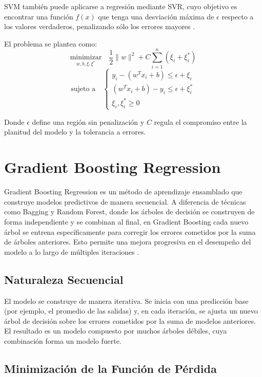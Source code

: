 	SVM también puede aplicarse a regresión mediante SVR, cuyo objetivo es encontrar una función $f(x)$ que tenga una desviación máxima de $\epsilon$ respecto a los valores verdaderos, penalizando sólo los errores mayores \citep{james2013, veirana2021}.
	
	El problema se plantea como:
	\[
	\underset{w, b, \xi, \xi^*}{\text{minimizar}} \quad \frac{1}{2} \|w\|^2 + C \sum_{i=1}^{n} (\xi_i + \xi_i^*)
	\]
	\[
	\text{sujeto a} \quad 
	\begin{cases}
		y_i - (w^T x_i + b) \leq \epsilon + \xi_i \\
		(w^T x_i + b) - y_i \leq \epsilon + \xi_i^* \\
		\xi_i, \xi_i^* \geq 0
	\end{cases}
	\]
	
	Donde $\epsilon$ define una región sin penalización y $C$ regula el compromiso entre la planitud del modelo y la tolerancia a errores.

	
	
\section{Gradient Boosting Regression}

Gradient Boosting Regression es un método de aprendizaje ensamblado que construye modelos predictivos de manera secuencial. A diferencia de técnicas como Bagging y Random Forest, donde los árboles de decisión se construyen de forma independiente y se combinan al final, en Gradient Boosting cada nuevo árbol se entrena específicamente para corregir los errores cometidos por la suma de árboles anteriores. Esto permite una mejora progresiva en el desempeño del modelo a lo largo de múltiples iteraciones \citep{hastie2009, friedman2001}.

\subsection{Naturaleza Secuencial}

El modelo se construye de manera iterativa. Se inicia con una predicción base (por ejemplo, el promedio de las salidas) y, en cada iteración, se ajusta un nuevo árbol de decisión sobre los errores cometidos por la suma de modelos anteriores. El resultado es un modelo compuesto por muchos árboles débiles, cuya combinación forma un modelo fuerte.

\subsection{Minimización de la Función de Pérdida}

